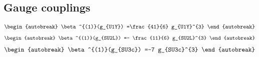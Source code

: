 \documentclass[12pt]{article}
\begin{document}
\subsection{Gauge couplings}
{\allowdisplaybreaks

\begin{align*}
\begin{autobreak}
\beta^{(1)}(g_{U1Y}) =\frac{41}{6} g_{U1Y}^{3}
\end{autobreak}
\end{align*}
\begin{align*}
\begin{autobreak}
\beta^{(1)}(g_{SU2L}) =- \frac{11}{6} g_{SU2L}^{3}
\end{autobreak}
\end{align*}
\begin{align*}
\begin{autobreak}
\beta^{(1)}(g_{SU3c}) =-7 g_{SU3c}^{3}
\end{autobreak}
\end{align*}
}
\end{document}
